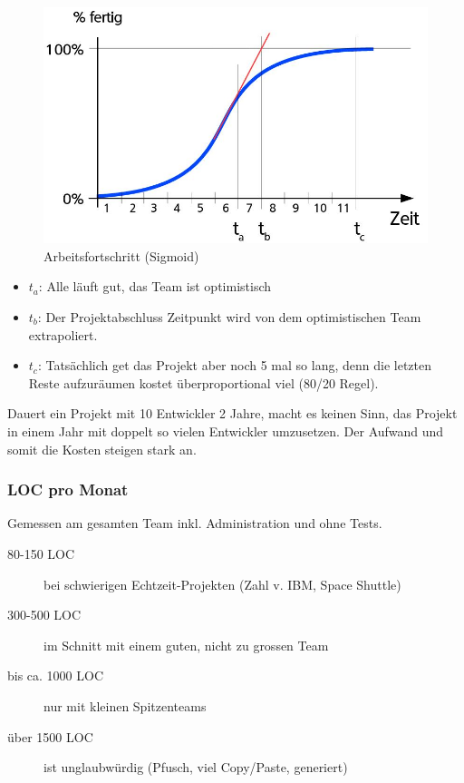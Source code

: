 \begin{figure}[h]
	\centering
	\includegraphics[width=0.8\linewidth]{img/arbeitsfortschritt_sigmoid}
	\caption{Arbeitsfortschritt (Sigmoid)}
	\label{fig:arbeitsfortschrittsigmoid}
\end{figure}

\begin{itemize}
	\item $t_a$: Alle läuft gut, das Team ist optimistisch
	\item $t_b$: Der Projektabschluss Zeitpunkt wird von dem optimistischen Team extrapoliert. 
	\item $t_c$: Tatsächlich get das Projekt aber noch 5 mal so lang, denn die letzten Reste aufzuräumen kostet überproportional viel (80/20 Regel).
\end{itemize}

Dauert ein Projekt mit 10 Entwickler 2 Jahre, macht es keinen Sinn, das Projekt in einem Jahr mit doppelt so vielen Entwickler umzusetzen. Der Aufwand und somit die Kosten steigen stark an. 

\subsubsection{LOC pro Monat}

Gemessen am gesamten Team inkl. Administration und ohne Tests.

\begin{description}
	\item[80-150 LOC] bei schwierigen Echtzeit-Projekten (Zahl v. IBM, Space Shuttle)
	\item[300-500 LOC] im Schnitt mit einem guten, nicht zu grossen Team
	\item[bis ca. 1000 LOC] nur mit kleinen Spitzenteams
	\item[über 1500 LOC] ist unglaubwürdig (Pfusch, viel Copy/Paste, generiert)
\end{description}


